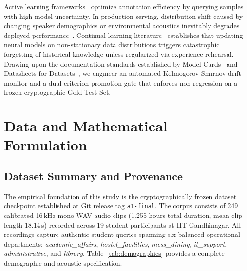 \documentclass[sigconf,authordraft]{acmart}
\begin{document}
Active learning frameworks~\cite{settles2010active} optimize annotation efficiency by querying samples with
high model uncertainty. In production serving, distribution shift caused by changing speaker demographics or
environmental acoustics inevitably degrades deployed performance~\cite{rabanser2019failing,swofford2021drift}.
Continual learning literature~\cite{demasson2019episodic} establishes that updating neural models on non-stationary
data distributions triggers catastrophic forgetting of historical knowledge unless regularized via experience
rehearsal. Drawing upon the documentation standards established by Model Cards~\cite{mitchell2019model} and
Datasheets for Datasets~\cite{gebru2021datasheets}, we engineer an automated Kolmogorov-Smirnov drift monitor
and a dual-criterion promotion gate that enforces non-regression on a frozen cryptographic Gold Test Set.

\section{Data and Mathematical Formulation}
\label{sec:methods}

\subsection{Dataset Summary and Provenance}

The empirical foundation of this study is the cryptographically frozen dataset checkpoint established
at Git release tag \texttt{a1-final}. The corpus consists of 249 calibrated 16\,kHz mono WAV audio clips
(1.255 hours total duration, mean clip length 18.14\,s) recorded across 19 student participants at IIT Gandhinagar.
All recordings capture authentic student queries spanning six balanced operational departments:
\emph{academic\_affairs}, \emph{hostel\_facilities}, \emph{mess\_dining}, \emph{it\_support},
\emph{administrative}, and \emph{library}. Table~\ref{tab:demographics} provides a complete demographic
and acoustic specification.
\end{document}
